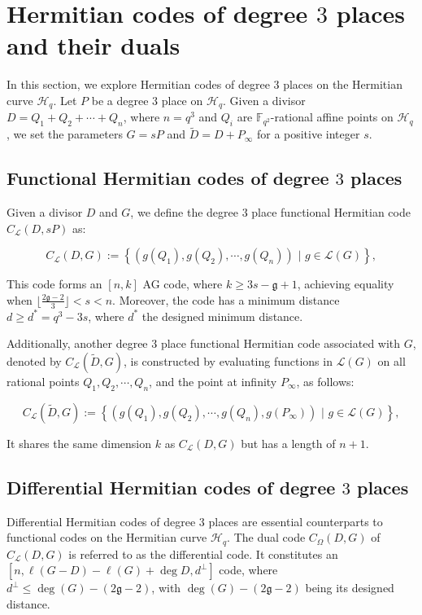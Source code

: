 \documentclass[a4paper]{amsart}
\theoremstyle{plain}
\theoremstyle{definition}
\theoremstyle{remark}
\newcommand{\g}{\mathfrak{g}}
\begin{document}
\section{Hermitian codes of degree $3$ places and their duals}

In this section, we explore Hermitian codes of degree $3$ places on the Hermitian curve $\mathscr{H}_q$. Let $P$ be a degree $3$ place on $\mathscr{H}_q$. Given a divisor $D=Q_1+Q_2+\cdots+Q_n$, where $n=q^3$ and $Q_i$ are $\mathbb{F}_{q^2}$-rational affine points on $\mathscr{H}_q$, we set the parameters $G=sP$ and $\tilde{D}=D+P_{\infty}$ for a positive integer $s$.


\subsection{Functional Hermitian codes of degree $3$ places}
Given a divisor $D$ and $G$, we define the degree $3$ place functional Hermitian code $C_{\mathcal{L}}(D,sP)$ as:

\[C_{\mathcal{L}}(D,G):= \left\lbrace \left(g(Q_1),g(Q_2),\cdots,g(Q_n) \right)\,\, |\,\, g \in  \mathcal{L}(G) \right\rbrace, \]

This code forms an $[n,k]$ AG code, where $k\geq 3s-\g+1$, achieving equality when $\lfloor\frac{ 2 \g-2}{3}\rfloor <s<n$. Moreover, the code has a minimum distance $d\geq d^*=q^3-3s$, where $d^*$ the designed minimum distance.

Additionally, another degree $3$ place functional Hermitian code associated with $G$, denoted by $C_{\mathcal{L}}(\tilde{D},G)$, is constructed by evaluating functions in $\mathcal{L}(G)$ on all rational points $Q_1,Q_2,\cdots,Q_n$, and the point at infinity $P_{\infty}$, as follows:

\[C_{\mathcal{L}}(\tilde{D},G):= \left\lbrace \left(g(Q_1),g(Q_2),\cdots,g(Q_n),g(P_{\infty}) \right)\,\, |\,\, g \in  \mathcal{L}(G)\right\rbrace ,\]

It shares the same dimension $k$ as $C_{\mathcal{L}}(D,G)$ but has a length of $n+1$. 


\subsection{Differential Hermitian codes of degree $3$ places}

Differential Hermitian codes of degree $3$ places are essential counterparts to functional codes on the Hermitian curve $\mathscr{H}_q$. The dual code $C_{\Omega}(D,G)$ of $C_{\mathcal{L}}(D,G)$ is referred to as the differential code. It constitutes an $[n, \ell(G -D)-\ell(G) +\deg D, d^{\perp}]$ code, where $d^{\perp} \leq \deg(G) - (2\g -2)$, with $\deg(G) - (2\g -2)$ being its designed distance.
\end{document}
